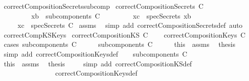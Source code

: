 \begin{isabellebody}
\isanewline
{}\isamarkupfalse%
\ correctCompositionSecrets{\isacharunderscore}subcomp{}{\isacharcolon}\isanewline
{}\ {\isachardoublequoteopen}correctCompositionSecrets\ C{\isachardoublequoteclose}\isanewline
\ \ \ \ \ \ \ \ \ {\isachardoublequoteopen}xb\ {\isasymin}\ subcomponents\ C{\isachardoublequoteclose}\isanewline
\ \ \ \ \ \ \ \ \ {\isachardoublequoteopen}xc\ {\isasymin}\ specSecrets\ xb{\isachardoublequoteclose}\isanewline
{}\ \ \ \ \ {\isachardoublequoteopen}xc\ {\isasymin}\ specSecrets\ C{\isachardoublequoteclose}\isanewline
%
\isadelimproof
%
\endisadelimproof
%
\isatagproof
{}\isamarkupfalse%
\ assms\ \isamarkupfalse%
\ {\isacharparenleft}simp\ add{\isacharcolon}\ correctCompositionSecrets{\isacharunderscore}def{\isacharcomma}\ auto{\isacharparenright}%
\endisatagproof
{\isafoldproof}%
%
\isadelimproof
\isanewline
%
\endisadelimproof
\isanewline
{}\isamarkupfalse%
\ correctCompKS{\isacharunderscore}Keys{\isacharcolon}\isanewline
{}\ {\isachardoublequoteopen}correctCompositionKS\ C{\isachardoublequoteclose}\isanewline
{}\ \ \ \ {\isachardoublequoteopen}correctCompositionKeys\ C{\isachardoublequoteclose}\isanewline
%
\isadelimproof
%
\endisadelimproof
%
\isatagproof
{}\isamarkupfalse%
\ {\isacharparenleft}cases\ {\isachardoublequoteopen}subcomponents\ C\ {\isacharequal}\ {\isacharbraceleft}{\isacharbraceright}{\isachardoublequoteclose}{\isacharparenright}\isanewline
\ \ \isamarkupfalse%
\ {\isachardoublequoteopen}subcomponents\ C\ {\isacharequal}\ {\isacharbraceleft}{\isacharbraceright}{\isachardoublequoteclose}\isanewline
\ \ \isamarkupfalse%
\ this\ \ assms\ \isamarkupfalse%
\ {\isacharquery}thesis\isanewline
\ \ \isamarkupfalse%
\ {\isacharparenleft}simp\ add{\isacharcolon}\ correctCompositionKeys{\isacharunderscore}def{\isacharparenright}\isanewline
{}\isamarkupfalse%
\isanewline
\ \ \isamarkupfalse%
\ {\isachardoublequoteopen}subcomponents\ C\ {\isasymnoteq}\ {\isacharbraceleft}{\isacharbraceright}{\isachardoublequoteclose}\isanewline
\ \ \isamarkupfalse%
\ this\ \ assms\ \isamarkupfalse%
\ {\isacharquery}thesis\ \isanewline
\ \ \isamarkupfalse%
\ {\isacharparenleft}simp\ add{\isacharcolon}\ correctCompositionKS{\isacharunderscore}def\ \isanewline
\ \ \ \ \ \ \ \ \ \ \ \ \ \ \ \ correctCompositionKeys{\isacharunderscore}def\isanewline

\end{isabellebody}
